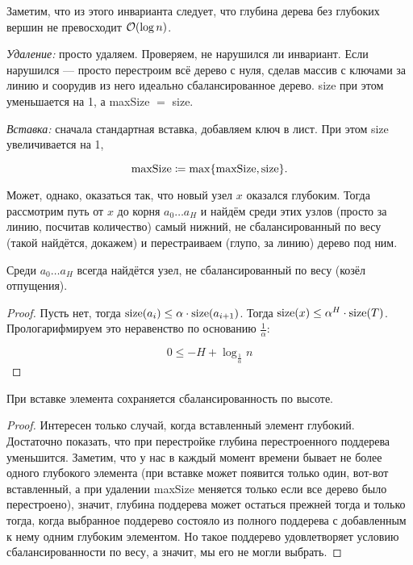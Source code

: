 Заметим, что из этого инварианта следует, что глубина дерева без глубоких вершин не превосходит $\mathcal{O}(\log n)$.

{\it Удаление:} просто удаляем. Проверяем, не нарушился ли инвариант. Если нарушился — просто перестроим всё дерево с нуля, сделав массив с ключами за линию и соорудив из него идеально сбалансированное дерево. size при этом уменьшается на 1, а maxSize $=$ size.

{\it Вставка:} сначала стандартная вставка, добавляем ключ в лист. При этом size увеличивается на 1,

\begin{equation*}
	\text{maxSize} \coloneqq \max \set*{\text{maxSize},\text{size}}.
\end{equation*}

Может, однако, оказаться так, что новый узел $x$ оказался глубоким. Тогда рассмотрим путь от $x$ до корня $a_0 \ldots a_{H}$ и найдём среди этих узлов (просто за линию, посчитав количество) самый нижний, не сбалансированный по весу (такой найдётся, докажем) и перестраиваем (глупо, за линию) дерево под ним.

\begin{theorem}
	Среди $a_0 \ldots a_{H}$ всегда найдётся узел, не сбалансированный по весу (козёл отпущения).
\end{theorem}

\begin{proof}
	Пусть нет, тогда $\operatorname{size} (a_i) \le \alpha \cdot \operatorname{size} (a_{i+1})$. Тогда $\operatorname{size} (x) \le \alpha^H \cdot \operatorname{size} (T)$. Прологарифмируем это неравенство по основанию $\frac{1}{\alpha}$:

	\begin{equation*}
		0 \le -H + \log_{\frac{1}{\alpha}} n
	\end{equation*}
\end{proof}

\begin{theorem}
	При вставке элемента сохраняется сбалансированность по высоте.
\end{theorem}
\begin{proof}
	Интересен только случай, когда вставленный элемент глубокий. Достаточно показать, что при перестройке глубина перестроенного поддерева уменьшится. Заметим, что у нас в каждый момент времени бывает не более одного глубокого элемента (при вставке может появится только один, вот-вот вставленный, а при удалении maxSize меняется только если все дерево было перестроено), значит, глубина поддерева может остаться прежней тогда и только тогда, когда выбранное поддерево состояло из полного поддерева с добавленным к нему одним глубоким элементом. Но такое поддерево удовлетворяет условию сбалансированности по весу, а значит, мы его не могли выбрать.
\end{proof}


